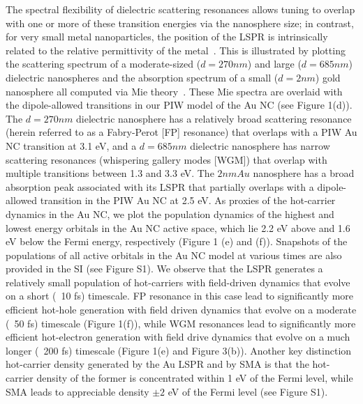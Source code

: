 \documentclass[journal=jpclcd,manuscript=letter]{achemso}
\begin{document}
The spectral flexibility of dielectric scattering
resonances allows tuning to overlap with one or more of these transition energies via the nanosphere size; in contrast, for very small 
metal nanoparticles, the position of the LSPR is intrinsically related to the relative permittivity of the metal~\cite{Bohren}.  This is
illustrated by plotting the scattering spectrum of a moderate-sized ($d=270nm$) and large ($d=685nm$) dielectric nanospheres and the 
absorption spectrum of a small ($d=2nm$) gold nanosphere all computed via Mie theory~\cite{Bohren}.  These Mie spectra are overlaid with the dipole-allowed
transitions in our PIW model of the Au NC (see Figure 1(d)). The $d=270nm$ dielectric nanosphere has a relatively broad scattering resonance 
(herein referred to as a Fabry-Perot [FP] resonance) that overlaps 
with a PIW Au NC transition at 3.1 eV, and
a $d=685nm$ dielectric nanosphere has narrow scattering resonances (whispering gallery modes [WGM]) 
that overlap with multiple transitions between 1.3 and 3.3 eV.  The $2nm Au$ nanosphere has a broad absorption peak associated with its LSPR that partially
overlaps with a dipole-allowed transition in the PIW Au NC at 2.5 eV. 
As proxies of the hot-carrier dynamics in the Au NC, we plot the population dynamics of the highest and lowest energy orbitals in the Au NC active space, which lie
2.2 eV above and 1.6 eV below the Fermi energy, respectively (Figure 1 (e) and (f)).  Snapshots of the populations of all active
orbitals in the Au NC model at various times are also provided in the SI (see Figure S1).  
We observe that the LSPR generates a relatively small
population of hot-carriers with field-driven dynamics that evolve on a short (~10 fs) timescale.  FP resonance in this
case lead to significantly more efficient hot-hole generation with field driven dynamics that evolve on a moderate (~50 fs) timescale (Figure 1(f)), while
WGM resonances lead to significantly more efficient hot-electron generation with field drive dynamics that evolve on a much longer (~200 fs) timescale
(Figure 1(e) and Figure 3(b)).  Another key distinction hot-carrier density generated by the Au LSPR and by SMA is that the hot-carrier density
of the former is concentrated within 1 eV of the Fermi level, while SMA leads to appreciable density $\pm 2$ eV of the Fermi level (see Figure S1).
\end{document}

